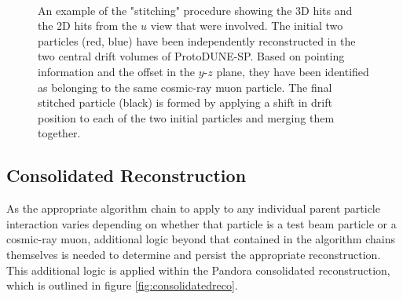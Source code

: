 \begin{figure}
\centering
{} \\
\caption{An example of the "stitching" procedure showing \protect{} the 3D hits and \protect{} the 2D hits from the $u$ view that were involved.  The initial two particles (red, blue) have been independently reconstructed in the two central drift volumes of ProtoDUNE-SP.  Based on pointing information and the offset in the $y$-$z$ plane, they have been identified as belonging to the same cosmic-ray muon particle.  The final stitched particle (black) is formed by applying a shift in drift position to each of the two initial particles and merging them together.}
\label{fig:stitching}
\end{figure}


\subsection{Consolidated Reconstruction}
\label{sec:consolidatedreco}
As the appropriate algorithm chain to apply to any individual parent particle interaction varies depending on whether that particle is a test beam particle or a cosmic-ray muon, additional logic beyond that contained in the algorithm chains themselves is needed to determine and persist the appropriate reconstruction. This additional logic is applied within the Pandora consolidated reconstruction, which is outlined in figure \ref{fig:consolidatedreco}.

